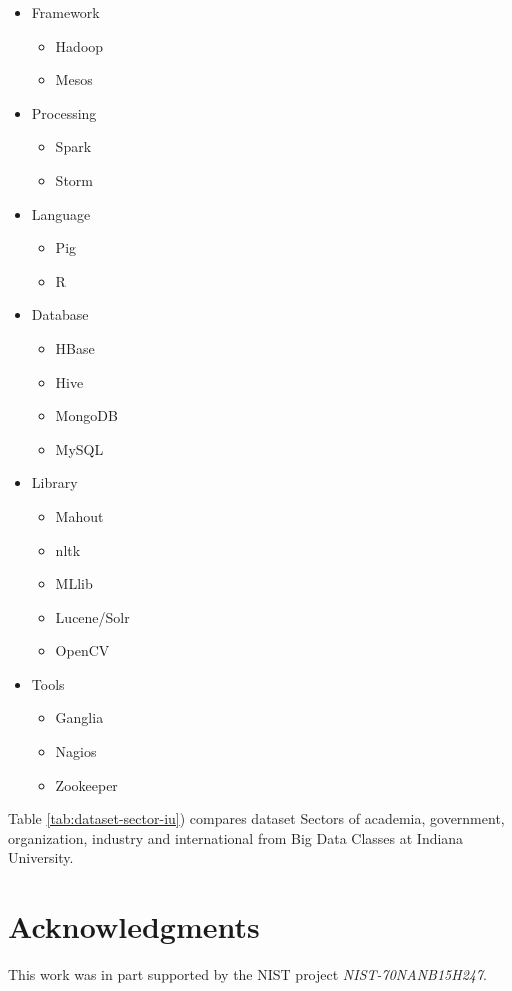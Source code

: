 \documentclass[9pt,twocolumn,twoside]{styles/osajnl}
\begin{document}
\begin{itemize}
\item Framework
\begin{itemize}
   \item Hadoop
   \item Mesos
\end{itemize}
\item Processing
\begin{itemize}
   \item Spark
   \item Storm
\end{itemize}
\item Language
\begin{itemize}
   \item Pig
   \item R
\end{itemize}
\item Database
\begin{itemize}
   \item HBase
   \item Hive
   \item MongoDB
   \item MySQL
\end{itemize}
\item Library
\begin{itemize}
   \item Mahout
   \item nltk
   \item MLlib
   \item Lucene/Solr
   \item OpenCV
\end{itemize}
\item Tools
\begin{itemize}
   \item Ganglia
   \item Nagios
   \item Zookeeper
\end{itemize}
\end{itemize}


Table \ref{tab:dataset-sector-iu}) compares dataset Sectors of
academia, government, organization, industry and international from
Big Data Classes at Indiana University.

\section*{Acknowledgments}

This work was in part supported by the NIST project {\it NIST-70NANB15H247}.
\end{document}
